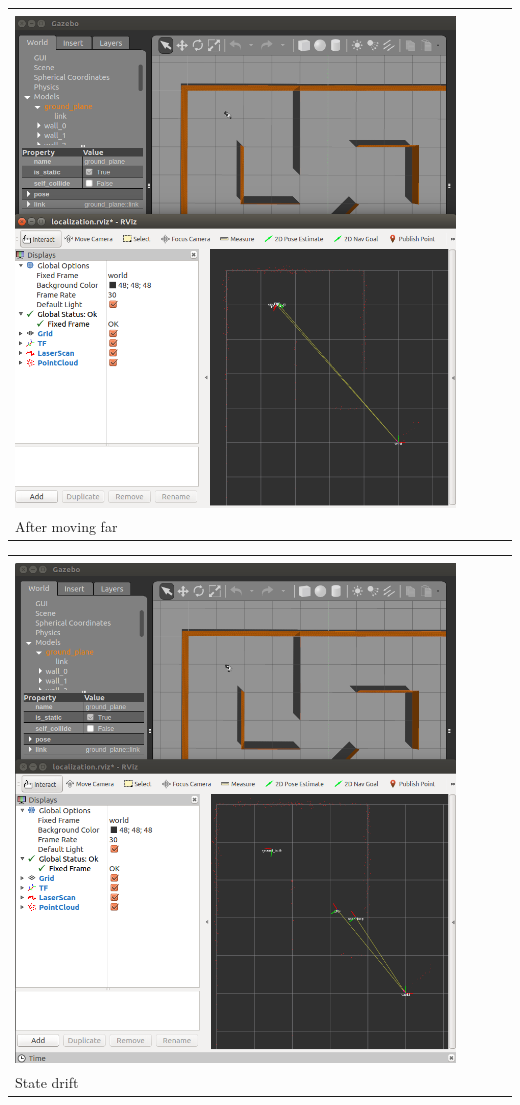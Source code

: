 \documentclass{article}
\begin{document}
\begin{enumerate}[label=(\roman*)]
\begin{tabular}[t]{l}
	\hline \\
	\includegraphics[width=0.9\textwidth]{img/p1-far.png} \\
	\hline
	After moving far \\
\end{tabular}

\begin{tabular}[t]{l}
	\hline \\
	\includegraphics[width=0.9\textwidth]{img/p1-drift.png} \\
	\hline
	State drift \\
\end{tabular}

\end{enumerate}
\end{document}
